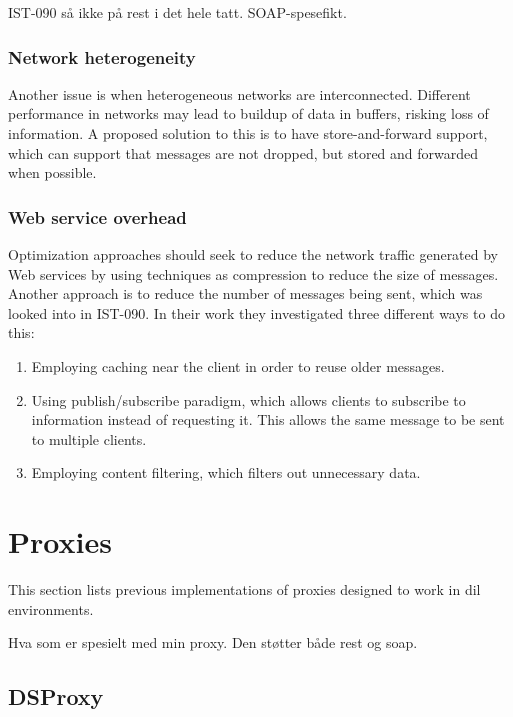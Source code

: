 IST-090 så ikke på rest i det hele tatt. SOAP-spesefikt.


\subsubsection{Network heterogeneity}

Another issue is when heterogeneous networks are interconnected. Different
performance in networks may lead to buildup of data in buffers, risking loss of
information. A proposed solution to this is to have store-and-forward support,
which can support that messages are not dropped, but stored and forwarded when
possible.


\subsubsection{Web service overhead}

Optimization approaches should seek to reduce the network traffic generated by
Web services by using techniques as compression to reduce the size of messages.
Another approach is to reduce the number of messages being sent, which was
looked into in IST-090\cite{ist-090}. In their work they investigated three
different ways to do this:

\begin{enumerate}
    \item Employing caching near the client in order to reuse older messages.
    \item Using publish/subscribe paradigm, which allows clients to subscribe to
    information instead of requesting it. This allows the same message to be sent
    to multiple clients.
    \item Employing content filtering, which filters out unnecessary data.
\end{enumerate}


\section{Proxies}

This section lists previous implementations of proxies designed to work in
\gls{dil} environments.

Hva som er spesielt med min proxy. Den støtter både rest og soap.

\subsection{DSProxy}

